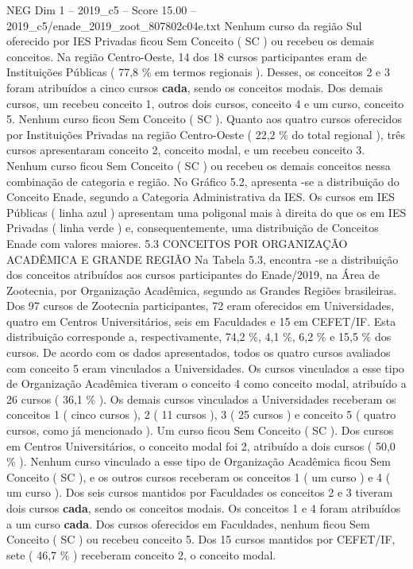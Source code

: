 \begin{textsample}{NEG Dim 1 – 2019\_c5 – Score 15.00 – 2019\_c5/enade\_2019\_zoot\_807802c04e.txt}
Nenhum curso da região Sul oferecido por IES Privadas ficou Sem Conceito ( SC ) ou recebeu os demais conceitos.
Na região Centro-Oeste, 14 dos 18 cursos participantes eram de Instituições Públicas ( 77,8 \% em termos regionais ).
Desses, os conceitos 2 e 3 foram atribuídos a cinco cursos \textbf{cada}, sendo os conceitos modais.
Dos demais cursos, um recebeu conceito 1, outros dois cursos, conceito 4 e um curso, conceito 5.
Nenhum curso ficou Sem Conceito ( SC ).
Quanto aos quatro cursos oferecidos por Instituições Privadas na região Centro-Oeste ( 22,2 \% do total regional ), três cursos apresentaram conceito 2, conceito modal, e um recebeu conceito 3.
Nenhum curso ficou Sem Conceito ( SC ) ou recebeu os demais conceitos nessa combinação de categoria e região.
No Gráfico 5.2, apresenta -se a distribuição do Conceito Enade, segundo a Categoria Administrativa da IES.
Os cursos em IES Públicas ( linha azul ) apresentam uma poligonal mais à direita do que os em IES Privadas ( linha verde ) e, consequentemente, uma distribuição de Conceitos Enade com valores maiores. 5.3 CONCEITOS POR ORGANIZAÇÃO ACADÊMICA E GRANDE REGIÃO Na Tabela 5.3, encontra -se a distribuição dos conceitos atribuídos aos cursos participantes do Enade/2019, na Área de Zootecnia, por Organização Acadêmica, segundo as Grandes Regiões brasileiras.
Dos 97 cursos de Zootecnia participantes, 72 eram oferecidos em Universidades, quatro em Centros Universitários, seis em Faculdades e 15 em CEFET/IF.
Esta distribuição corresponde a, respectivamente, 74,2 \%, 4,1 \%, 6,2 \% e 15,5 \% dos cursos.
De acordo com os dados apresentados, todos os quatro cursos avaliados com conceito 5 eram vinculados a Universidades.
Os cursos vinculados a esse tipo de Organização Acadêmica tiveram o conceito 4 como conceito modal, atribuído a 26 cursos ( 36,1 \% ).
Os demais cursos vinculados a Universidades receberam os conceitos 1 ( cinco cursos ), 2 ( 11 cursos ), 3 ( 25 cursos ) e conceito 5 ( quatro cursos, como já mencionado ).
Um curso ficou Sem Conceito ( SC ).
Dos cursos em Centros Universitários, o conceito modal foi 2, atribuído a dois cursos ( 50,0 \% ).
Nenhum curso vinculado a esse tipo de Organização Acadêmica ficou Sem Conceito ( SC ), e os outros cursos receberam os conceitos 1 ( um curso ) e 4 ( um curso ).
Dos seis cursos mantidos por Faculdades os conceitos 2 e 3 tiveram dois cursos \textbf{cada}, sendo os conceitos modais.
Os conceitos 1 e 4 foram atribuídos a um curso \textbf{cada}.
Dos cursos oferecidos em Faculdades, nenhum ficou Sem Conceito ( SC ) ou recebeu conceito 5.
Dos 15 cursos mantidos por CEFET/IF, sete ( 46,7 \% ) receberam conceito 2, o conceito modal.

\end{textsample}
